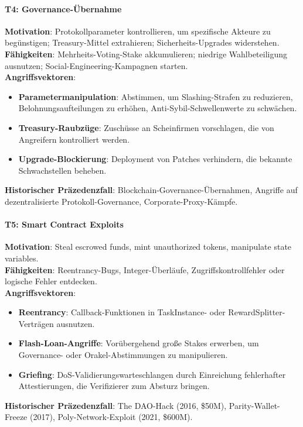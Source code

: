 \documentclass[11pt]{article}
\begin{document}
\paragraph{T4: Governance-Übernahme}
\textbf{Motivation}: Protokollparameter kontrollieren, um spezifische Akteure zu begünstigen; Treasury-Mittel extrahieren; Sicherheits-Upgrades widerstehen.\\
\textbf{Fähigkeiten}: Mehrheits-Voting-Stake akkumulieren; niedrige Wahlbeteiligung ausnutzen; Social-Engineering-Kampagnen starten.\\
\textbf{Angriffsvektoren}:
\begin{itemize}[noitemsep]
  \item \textbf{Parametermanipulation}: Abstimmen, um Slashing-Strafen zu reduzieren, Belohnungsaufteilungen zu erhöhen, Anti-Sybil-Schwellenwerte zu schwächen.
  \item \textbf{Treasury-Raubzüge}: Zuschüsse an Scheinfirmen vorschlagen, die von Angreifern kontrolliert werden.
  \item \textbf{Upgrade-Blockierung}: Deployment von Patches verhindern, die bekannte Schwachstellen beheben.
\end{itemize}
\textbf{Historischer Präzedenzfall}: Blockchain-Governance-Übernahmen, Angriffe auf dezentralisierte Protokoll-Governance, Corporate-Proxy-Kämpfe.

\paragraph{T5: Smart Contract Exploits}
\textbf{Motivation}: Steal escrowed funds, mint unauthorized tokens, manipulate state variables.\\
\textbf{Fähigkeiten}: Reentrancy-Bugs, Integer-Überläufe, Zugriffskontrollfehler oder logische Fehler entdecken.\\
\textbf{Angriffsvektoren}:
\begin{itemize}[noitemsep]
  \item \textbf{Reentrancy}: Callback-Funktionen in TaskInstance- oder RewardSplitter-Verträgen ausnutzen.
  \item \textbf{Flash-Loan-Angriffe}: Vorübergehend große Stakes erwerben, um Governance- oder Orakel-Abstimmungen zu manipulieren.
  \item \textbf{Griefing}: DoS-Validierungswarteschlangen durch Einreichung fehlerhafter Attestierungen, die Verifizierer zum Absturz bringen.
\end{itemize}
\textbf{Historischer Präzedenzfall}: The DAO-Hack (2016, \$50M), Parity-Wallet-Freeze (2017), Poly-Network-Exploit (2021, \$600M).
\end{document}
